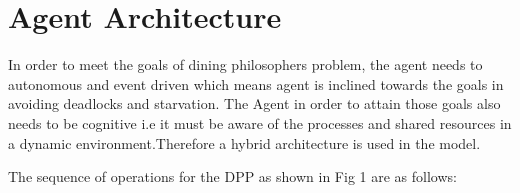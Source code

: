 \section{Agent Architecture}

In order to meet the goals of dining philosophers problem, the agent needs to autonomous and event driven which means agent is inclined towards the goals in avoiding deadlocks and starvation. The Agent in order to attain those goals also needs to be cognitive i.e it must be aware of the processes and shared resources in a dynamic environment.Therefore a hybrid architecture is used in the model.  

The sequence of operations for the DPP as shown in Fig 1 are as follows: